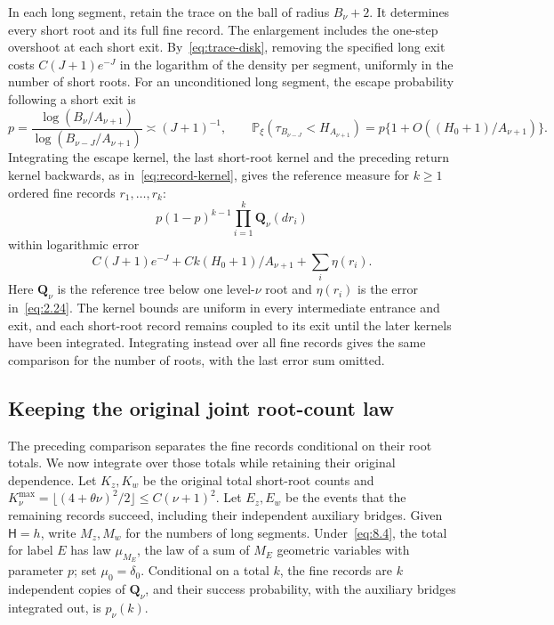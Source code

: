 \documentclass[11pt,a4paper]{article}
\numberwithin{equation}{section}
\theoremstyle{remark}
\begin{document}
In each long segment, retain the trace on the ball of radius $B_\nu+2$. It determines every short root and its full fine record. The enlargement includes the one-step overshoot at each short exit. By~\eqref{eq:trace-disk}, removing the specified long exit costs $C(J+1)e^{-J}$ in the logarithm of the density per segment, uniformly in the number of short roots. For an unconditioned long segment, the escape probability following a short exit is
\begin{equation}\label{eq:8.1}
 p=\frac{\log(B_\nu/A_{\nu+1})}{\log(B_{\nu-J}/A_{\nu+1})}
 \asymp(J+1)^{-1},\qquad
 \mathbb P_\xi(\tau_{B_{\nu-J}}<H_{A_{\nu+1}})
 =p\{1+O((H_0+1)/A_{\nu+1})\}.
\end{equation}
Integrating the escape kernel, the last short-root kernel and the preceding return kernel backwards, as in~\eqref{eq:record-kernel}, gives the reference measure for $k\ge1$ ordered fine records $r_1,\ldots,r_k$:
\begin{equation}\label{eq:8.4}
 p(1-p)^{k-1}\prod_{i=1}^k\mathbf Q_\nu(dr_i)
\end{equation}
within logarithmic error
\[
 C(J+1)e^{-J}+Ck(H_0+1)/A_{\nu+1}+\sum_i\eta(r_i).
\]
Here $\mathbf Q_\nu$ is the reference tree below one level-$\nu$ root and $\eta(r_i)$ is the error in~\eqref{eq:2.24}. The kernel bounds are uniform in every intermediate entrance and exit, and each short-root record remains coupled to its exit until the later kernels have been integrated. Integrating instead over all fine records gives the same comparison for the number of roots, with the last error sum omitted.

\subsection{Keeping the original joint root-count law}\label{sec:jointroots}
The preceding comparison separates the fine records conditional on their root totals. We now integrate over those totals while retaining their original dependence. Let $K_z,K_w$ be the original total short-root counts and
$K_\nu^{\max}=\lfloor(4+\theta\nu)^2/2\rfloor\le C(\nu+1)^2$.
Let $E_z,E_w$ be the events that the remaining records succeed, including their independent auxiliary bridges. Given $\mathsf H=h$, write $M_z,M_w$ for the numbers of long segments. Under~\eqref{eq:8.4}, the total for label $E$ has law $\mu_{M_E}$, the law of a sum of $M_E$ geometric variables with parameter $p$; set $\mu_0=\delta_0$. Conditional on a total $k$, the fine records are $k$ independent copies of $\mathbf Q_\nu$, and their success probability, with the auxiliary bridges integrated out, is $p_\nu(k)$.
\end{document}

